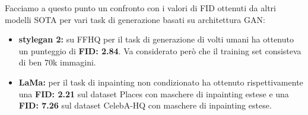 Facciamo a questo punto un confronto con i valori di FID ottenuti da altri modelli SOTA per vari task di generazione basati su architettura GAN:
\begin{itemize}
    \item \textbf{stylegan 2:} su FFHQ per il task di generazione di volti umani ha ottenuto un punteggio di \textbf{FID: 2.84}. Va considerato
        però che il training set consisteva di ben 70k immagini.
    \item \textbf{LaMa:} per il task di inpainting non condizionato ha ottenuto rispettivamente una \textbf{FID: 2.21} sul dataset Places con maschere di inpainting
    estese e una \textbf{FID: 7.26} sul dataset CelebA-HQ con maschere di inpainting estese.
\end{itemize}